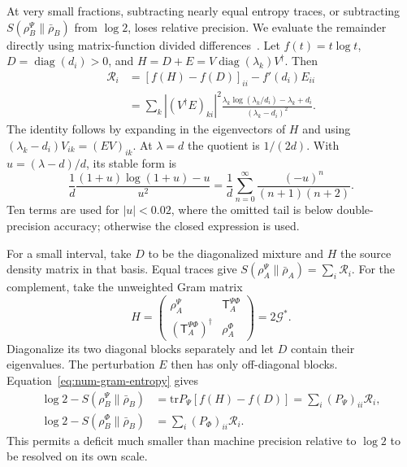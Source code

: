 \documentclass[11pt]{article}
\newcommand{\tr}{\mathrm{tr}}
\begin{document}
At very small fractions, subtracting nearly equal entropy traces,
or subtracting $S(\rho_B^\Psi\|\bar\rho_B)$ from $\log2$, loses relative precision.
We evaluate the remainder directly using matrix-function
divided differences~\cite{numHigham}. Let $f(t)=t\log t$,
$D=\operatorname{diag}(d_i)>0$, and
$H=D+E=V\operatorname{diag}(\lambda_k)V^\dagger$. Then
\begin{align}
 \mathcal R_i&=[f(H)-f(D)]_{ii}-f'(d_i)E_{ii}\nonumber\\
 &=\sum_k|(V^\dagger E)_{ki}|^2
 \frac{\lambda_k\log(\lambda_k/d_i)-\lambda_k+d_i}
      {(\lambda_k-d_i)^2}.
 \label{eq:num-stable-remainder}
\end{align}
The identity follows by expanding in the eigenvectors of $H$
and using $(\lambda_k-d_i)V_{ik}=(EV)_{ik}$. At $\lambda=d$ the quotient is $1/(2d)$. With
$u=(\lambda-d)/d$, its stable form is
\begin{equation}
 \frac1d\frac{(1+u)\log(1+u)-u}{u^2}
 =\frac1d\sum_{n=0}^{\infty}\frac{(-u)^n}{(n+1)(n+2)}.
 \label{eq:num-scalar-remainder}
\end{equation}
Ten terms are used for $|u|<0.02$, where the omitted tail is
below double-precision accuracy; otherwise the closed expression
is used.

For a small interval, take $D$ to be the diagonalized mixture
and $H$ the source density matrix in that basis. Equal traces
give $S(\rho_A^\Psi\|\bar\rho_A)=\sum_i\mathcal R_i$. For the complement,
take the unweighted Gram matrix
\begin{equation}
 H=\begin{pmatrix}\rho_A^\Psi&\mathsf T_A^{\Psi\Phi}\\
 (\mathsf T_A^{\Psi\Phi})^\dagger&\rho_A^\Phi\end{pmatrix}=2\mathcal G^*.
 \label{eq:num-unweighted-gram}
\end{equation}
Diagonalize its two diagonal blocks separately and let $D$
contain their eigenvalues. The perturbation $E$ then has only
off-diagonal blocks. Equation~\eqref{eq:num-gram-entropy} gives
\begin{align}
 \log2-S(\rho_B^\Psi\|\bar\rho_B)
 &=\tr P_{\Psi}[f(H)-f(D)]
 =\sum_i(P_{\Psi})_{ii}\mathcal R_i,\nonumber\\
 \log2-S(\rho_B^\Phi\|\bar\rho_B)
 &=\sum_i(P_{\Phi})_{ii}\mathcal R_i.
 \label{eq:num-stable-deficit}
\end{align}
This permits a deficit much smaller than machine precision
relative to $\log2$ to be resolved on its own scale.
\end{document}
